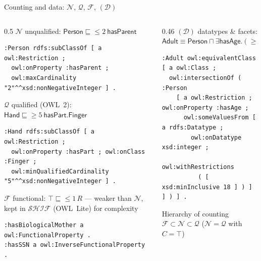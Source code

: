 \documentclass[10pt,aspectratio=169,xcolor=table]{beamer}
\newcommand{\dl}[1]{\ensuremath{\mathcal{#1}}}
\newcommand{\SHIF}{\dl{SHIF}}
\newcommand{\cn}[1]{\mathsf{#1}}
\newcommand{\rn}[1]{\mathsf{#1}}
\newcommand{\sub}{\sqsubseteq}
\newcommand{\eqv}{\equiv}
\begin{document}
\begin{frame}[fragile]{Counting and data: \dl{N}, \dl{Q}, \dl{F}, $(\mathcal{D})$}
  \begin{columns}[T]
    \begin{column}{0.5\textwidth}
      \footnotesize
      \textbf{\dl{N}} unqualified: $\cn{Person} \sub {\leq}2\ \rn{hasParent}$
\begin{lstlisting}
:Person rdfs:subClassOf [ a owl:Restriction ;
  owl:onProperty :hasParent ;
  owl:maxCardinality "2"^^xsd:nonNegativeInteger ] .
\end{lstlisting}
      \textbf{\dl{Q}} qualified (OWL~2): $\cn{Hand} \sub {\geq}5\ \rn{hasPart}.\cn{Finger}$
\begin{lstlisting}
:Hand rdfs:subClassOf [ a owl:Restriction ;
  owl:onProperty :hasPart ; owl:onClass :Finger ;
  owl:minQualifiedCardinality "5"^^xsd:nonNegativeInteger ] .
\end{lstlisting}
      \textbf{\dl{F}} functional: $\top \sub {\leq}1\,R$ --- weaker than \dl{N}, kept in
      $\SHIF$ (OWL~Lite) for complexity
\begin{lstlisting}
:hasBiologicalMother a owl:FunctionalProperty .
:hasSSN a owl:InverseFunctionalProperty .
\end{lstlisting}
    \end{column}
    \begin{column}{0.46\textwidth}
      \footnotesize
      \textbf{$(\mathcal{D})$} datatypes \& facets:\\
      $\cn{Adult} \eqv \cn{Person} \sqcap \exists \rn{hasAge}.({\geq}18)$
\begin{lstlisting}
:Adult owl:equivalentClass [ a owl:Class ;
  owl:intersectionOf ( :Person
    [ a owl:Restriction ; owl:onProperty :hasAge ;
      owl:someValuesFrom [ a rdfs:Datatype ;
        owl:onDatatype xsd:integer ;
        owl:withRestrictions
          ( [ xsd:minInclusive 18 ] ) ] ] ) ] .
\end{lstlisting}
      \vspace{4pt}
      \begin{alertblock}{Hierarchy of counting}
        $\dl{F} \subset \dl{N} \subset \dl{Q}$ \quad ($\dl{N} = \dl{Q}$ with $C = \top$)
      \end{alertblock}
    \end{column}
  \end{columns}
\end{frame}

\end{document}
